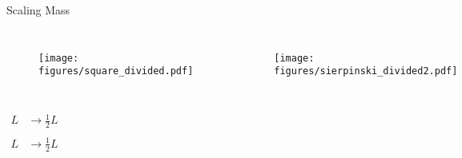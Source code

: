 \documentclass[10pt]{beamer}
\begin{document}
\begin{frame}{Scaling Mass}
    \begin{columns}[c]
        \column{1.5in}
        \begin{figure}[h!]
            \centering
            \texttt{[image: figures/square\_divided.pdf]}
        \end{figure}
    \column{1.5in}
        \begin{figure}[h!]
            \centering
            \texttt{[image: figures/sierpinski\_divided2.pdf]}
        \end{figure}
    \end{columns}
    \begin{columns}[c]
        \column{1.5in}
            \begin{align*}
                L &\rightarrow \frac{1}{2} L \\
            \end{align*}
        \column{1.5in}
            \begin{align*}
                L &\rightarrow \frac{1}{2} L \\
            \end{align*}
    \end{columns}
\end{frame}
\end{document}
